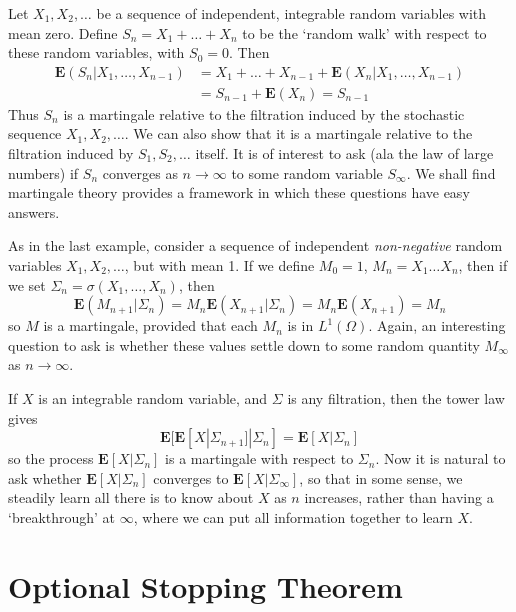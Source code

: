 \begin{example}
    Let $X_1, X_2, \dots$ be a sequence of independent, integrable random variables with mean zero. Define $S_n = X_1 + \dots + X_n$ to be the `random walk' with respect to these random variables, with $S_0 = 0$. Then
    \begin{align*}
        \mathbf{E}(S_n|X_1, \dots, X_{n-1}) &= X_1 + \dots + X_{n-1} + \mathbf{E}(X_n|X_1, \dots, X_{n-1})\\
        &= S_{n-1} + \mathbf{E}(X_n) = S_{n-1}
    \end{align*}
    Thus $S_n$ is a martingale relative to the filtration induced by the stochastic sequence $X_1, X_2, \dots$. We can also show that it is a martingale relative to the filtration induced by $S_1, S_2, \dots$ itself. It is of interest to ask (ala the law of large numbers) if $S_n$ converges as $n \to \infty$ to some random variable $S_\infty$. We shall find martingale theory provides a framework in which these questions have easy answers.
\end{example}

\begin{example}
    As in the last example, consider a sequence of independent {\it non-negative} random variables $X_1, X_2, \dots$, but with mean 1. If we define $M_0 = 1$, $M_n = X_1 \dots X_n$, then if we set $\Sigma_n = \sigma(X_1, \dots, X_n)$, then
    \[ \mathbf{E}(M_{n+1}|\Sigma_n) = M_n \mathbf{E}(X_{n+1}|\Sigma_n) = M_n \mathbf{E}(X_{n+1}) = M_n \]
    so $M$ is a martingale, provided that each $M_n$ is in $L^1(\Omega)$. Again, an interesting question to ask is whether these values settle down to some random quantity $M_\infty$ as $n \to \infty$.
\end{example}

\begin{example}
    If $X$ is an integrable random variable, and $\Sigma$ is any filtration, then the tower law gives
    \[ \mathbf{E}[\mathbf{E}[X|\Sigma_{n+1}]|\Sigma_n] = \mathbf{E}[X|\Sigma_n] \]
    so the process $\mathbf{E}[X|\Sigma_n]$ is a martingale with respect to $\Sigma_n$. Now it is natural to ask whether $\mathbf{E}[X|\Sigma_n]$ converges to $\mathbf{E}[X|\Sigma_\infty]$, so that in some sense, we steadily learn all there is to know about $X$ as $n$ increases, rather than having a `breakthrough' at $\infty$, where we can put all information together to learn $X$.
\end{example}

\section{Optional Stopping Theorem}

